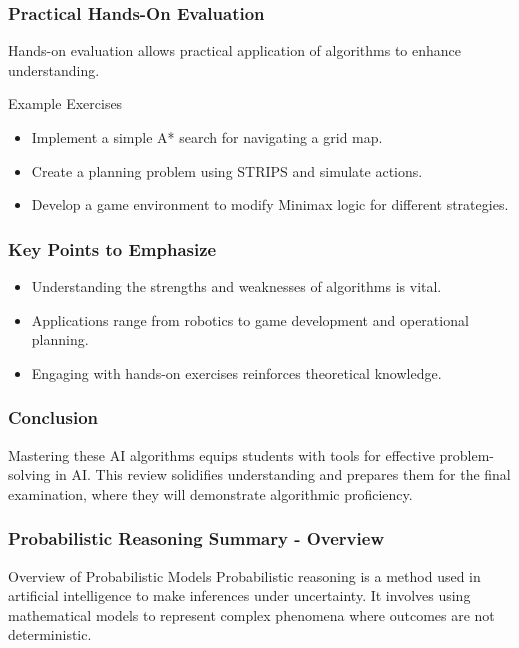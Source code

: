 \documentclass[aspectratio=169]{beamer}
\begin{document}
\begin{frame}[fragile]
    \frametitle{Practical Hands-On Evaluation}
    Hands-on evaluation allows practical application of algorithms to enhance understanding.

    \begin{block}{Example Exercises}
        \begin{itemize}
            \item Implement a simple A* search for navigating a grid map.
            \item Create a planning problem using STRIPS and simulate actions.
            \item Develop a game environment to modify Minimax logic for different strategies.
        \end{itemize}
    \end{block}
\end{frame}

\begin{frame}[fragile]
    \frametitle{Key Points to Emphasize}
    \begin{itemize}
        \item Understanding the strengths and weaknesses of algorithms is vital.
        \item Applications range from robotics to game development and operational planning.
        \item Engaging with hands-on exercises reinforces theoretical knowledge.
    \end{itemize}
\end{frame}

\begin{frame}[fragile]
    \frametitle{Conclusion}
    Mastering these AI algorithms equips students with tools for effective problem-solving in AI. This review solidifies understanding and prepares them for the final examination, where they will demonstrate algorithmic proficiency.
\end{frame}

\begin{frame}[fragile]
  \frametitle{Probabilistic Reasoning Summary - Overview}
  \begin{block}{Overview of Probabilistic Models}
    Probabilistic reasoning is a method used in artificial intelligence to make inferences under uncertainty. 
    It involves using mathematical models to represent complex phenomena where outcomes are not deterministic.
  \end{block}
\end{frame}
\end{document}

